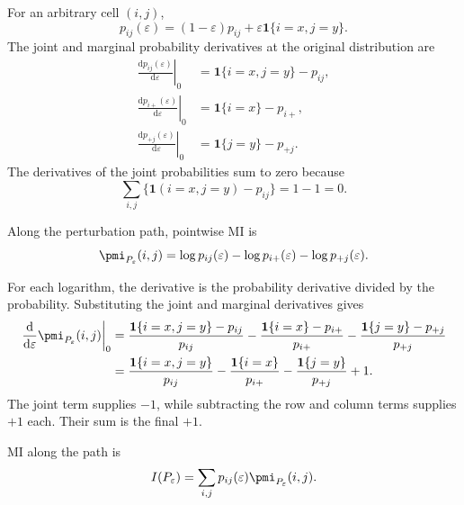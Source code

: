 For an arbitrary cell \((i,j)\),
\begin{equation}
  p_{ij}(\varepsilon)
  =(1-\varepsilon)p_{ij}
  +\varepsilon\mathbf 1\{i=x,j=y\}.
\end{equation}
The joint and marginal probability derivatives at the original distribution
are
\begin{align}
  \left.\frac{\mathrm d p_{ij}(\varepsilon)}{\mathrm d\varepsilon}
  \right|_{0}
  &=\mathbf 1\{i=x,j=y\}-p_{ij},
  \label{eq:joint-perturbation-derivative}\\
  \left.\frac{\mathrm d p_{i+}(\varepsilon)}{\mathrm d\varepsilon}
  \right|_{0}
  &=\mathbf 1\{i=x\}-p_{i+},\\
  \left.\frac{\mathrm d p_{+j}(\varepsilon)}{\mathrm d\varepsilon}
  \right|_{0}
  &=\mathbf 1\{j=y\}-p_{+j}.
\end{align}
The derivatives of the joint probabilities sum to zero because
\begin{equation}
  \sum_{i,j}
  \{\mathbf 1(i=x,j=y)-p_{ij}\}
  =1-1=0.
\end{equation}

\medskip
{}

Along the perturbation path, pointwise MI is
\begin{equation}
  \pmi_{P_\varepsilon}(i,j)
  =\log p_{ij}(\varepsilon)
  -\log p_{i+}(\varepsilon)
  -\log p_{+j}(\varepsilon).
\end{equation}
\begin{samepage}
For each logarithm, the derivative is the probability derivative divided by
the probability. Substituting the joint and marginal derivatives gives
\begin{align}
  \left.
  \frac{\mathrm d}{\mathrm d\varepsilon}
  \pmi_{P_\varepsilon}(i,j)
  \right|_{0}
  &={}
  \frac{\mathbf 1\{i=x,j=y\}-p_{ij}}{p_{ij}}
  -\frac{\mathbf 1\{i=x\}-p_{i+}}{p_{i+}}
  -\frac{\mathbf 1\{j=y\}-p_{+j}}{p_{+j}}
  \notag\\*
  &={}
  \frac{\mathbf 1\{i=x,j=y\}}{p_{ij}}
  -\frac{\mathbf 1\{i=x\}}{p_{i+}}
  -\frac{\mathbf 1\{j=y\}}{p_{+j}}
  +1.
  \label{eq:pmi-derivative}
\end{align}
The joint term supplies \(-1\), while subtracting the row and column
terms supplies \(+1\) each. Their sum is the final \(+1\).
\par
\end{samepage}

MI along the path is
\begin{equation}
  I(P_\varepsilon)
  =\sum_{i,j}p_{ij}(\varepsilon)
  \pmi_{P_\varepsilon}(i,j).
\end{equation}

